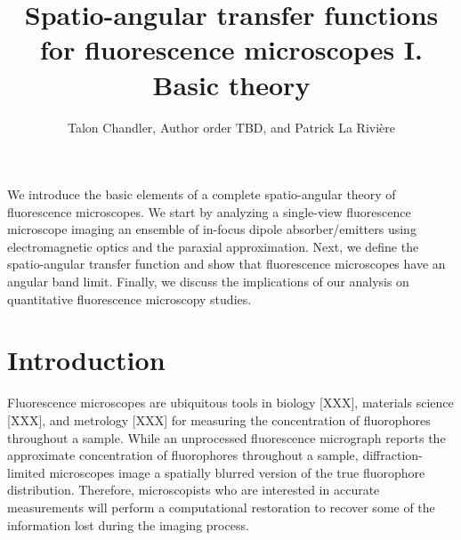\documentclass{osa-article}
\begin{document}
\title{Spatio-angular transfer functions for fluorescence microscopes I. Basic theory}

\author{Talon Chandler, Author order TBD, and Patrick La Rivi\`ere }

\address{University of Chicago, Department of Radiology, Chicago, Illinois 60637, USA\\
Publications Department, The Optical Society, 2010 Massachusetts Avenue NW, Washington, DC 20036, USA\\
Currently with the Department of Electronic Journals, The Optical Society, 2010 Massachusetts Avenue NW, Washington, DC 20036, USA}




\begin{abstract*}
  We introduce the basic elements of a complete spatio-angular theory of
  fluorescence microscopes. We start by analyzing a single-view fluorescence
  microscope imaging an ensemble of in-focus dipole absorber/emitters using
  electromagnetic optics and the paraxial approximation. Next, we define the
  spatio-angular transfer function and show that fluorescence microscopes have
  an angular band limit. Finally, we discuss the implications of our analysis on
  quantitative fluorescence microscopy studies.
\end{abstract*}

\section{Introduction}
Fluorescence microscopes are ubiquitous tools in biology [XXX], materials
science [XXX], and metrology [XXX] for measuring the concentration of
fluorophores throughout a sample. While an unprocessed fluorescence micrograph
reports the approximate concentration of fluorophores throughout a sample,
diffraction-limited microscopes image a spatially blurred version of the true
fluorophore distribution. Therefore, microscopists who are interested in
accurate measurements will perform a computational restoration to recover some
of the information lost during the imaging process.
\end{document}
